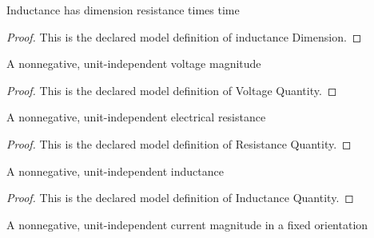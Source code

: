 \begin{definition}
  \label{def:physics:phyx-mini-0881:phyxminiproblems-problemphyxmini0881-inductancedimension}
  Inductance has dimension resistance times time
\end{definition}
\begin{proof}
  This is the declared model definition of inductance Dimension.
\end{proof}
\begin{definition}
  \label{def:physics:phyx-mini-0881:phyxminiproblems-problemphyxmini0881-voltagequantity}
  A nonnegative, unit-independent voltage magnitude
\end{definition}
\begin{proof}
  This is the declared model definition of Voltage Quantity.
\end{proof}
\begin{definition}
  \label{def:physics:phyx-mini-0881:phyxminiproblems-problemphyxmini0881-resistancequantity}
  A nonnegative, unit-independent electrical resistance
\end{definition}
\begin{proof}
  This is the declared model definition of Resistance Quantity.
\end{proof}
\begin{definition}
  \label{def:physics:phyx-mini-0881:phyxminiproblems-problemphyxmini0881-inductancequantity}
  A nonnegative, unit-independent inductance
\end{definition}
\begin{proof}
  This is the declared model definition of Inductance Quantity.
\end{proof}
\begin{definition}
  \label{def:physics:phyx-mini-0881:phyxminiproblems-problemphyxmini0881-electriccurrentquantity}
  A nonnegative, unit-independent current magnitude in a fixed orientation
\end{definition}
